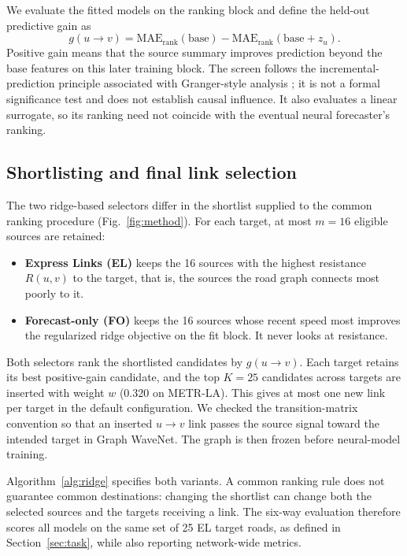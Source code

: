 \documentclass[journal]{IEEEtran}
\begin{document}
We evaluate the fitted models on the ranking block and define the held-out predictive gain as
\begin{equation}
g(u\to v)=\mathrm{MAE}_{\mathrm{rank}}(\text{base})-\mathrm{MAE}_{\mathrm{rank}}(\text{base}+z_u).
\label{eq:predictive_gain}
\end{equation}
Positive gain means that the source summary improves prediction beyond the base features on this later training block. The screen follows the incremental-prediction principle associated with Granger-style analysis \cite{granger1969}; it is not a formal significance test and does not establish causal influence. It also evaluates a linear surrogate, so its ranking need not coincide with the eventual neural forecaster's ranking.

\subsection{Shortlisting and final link selection}
The two ridge-based selectors differ in the shortlist supplied to the common ranking procedure (Fig.~\ref{fig:method}). For each target, at most $m=16$ eligible sources are retained:
\begin{itemize}
\item \textbf{Express Links (EL)} keeps the 16 sources with the highest resistance $R(u,v)$ to the target, that is, the sources the road graph connects most poorly to it.
\item \textbf{Forecast-only (FO)} keeps the 16 sources whose recent speed most improves the regularized ridge objective on the fit block. It never looks at resistance.
\end{itemize}
Both selectors rank the shortlisted candidates by $g(u\to v)$. Each target retains its best positive-gain candidate, and the top $K=25$ candidates across targets are inserted with weight $w$ (0.320 on METR-LA). This gives at most one new link per target in the default configuration. We checked the transition-matrix convention so that an inserted $u\to v$ link passes the source signal toward the intended target in Graph WaveNet. The graph is then frozen before neural-model training.

Algorithm~\ref{alg:ridge} specifies both variants. A common ranking rule does not guarantee common destinations: changing the shortlist can change both the selected sources and the targets receiving a link. The six-way evaluation therefore scores all models on the same set of 25 EL target roads, as defined in Section~\ref{sec:task}, while also reporting network-wide metrics.
\end{document}
